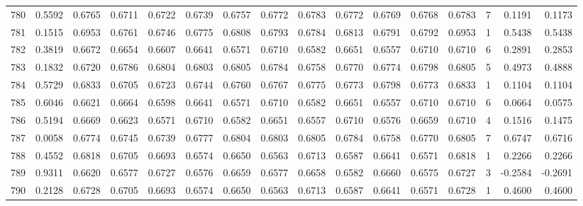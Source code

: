 \begin{tabular}{lrrrrrrrrrrrrrrr}
780 &      0.5592 &  0.6765 &  0.6711 &  0.6722 &  0.6739 &  0.6757 &  0.6772 &  0.6783 &  0.6772 &  0.6769 &   0.6768 &     0.6783 &      7 &                    0.1191 &                     0.1173 \\
781 &      0.1515 &  0.6953 &  0.6761 &  0.6746 &  0.6775 &  0.6808 &  0.6793 &  0.6784 &  0.6813 &  0.6791 &   0.6792 &     0.6953 &      1 &                    0.5438 &                     0.5438 \\
782 &      0.3819 &  0.6672 &  0.6654 &  0.6607 &  0.6641 &  0.6571 &  0.6710 &  0.6582 &  0.6651 &  0.6557 &   0.6710 &     0.6710 &      6 &                    0.2891 &                     0.2853 \\
783 &      0.1832 &  0.6720 &  0.6786 &  0.6804 &  0.6803 &  0.6805 &  0.6784 &  0.6758 &  0.6770 &  0.6774 &   0.6798 &     0.6805 &      5 &                    0.4973 &                     0.4888 \\
784 &      0.5729 &  0.6833 &  0.6705 &  0.6723 &  0.6744 &  0.6760 &  0.6767 &  0.6775 &  0.6773 &  0.6798 &   0.6773 &     0.6833 &      1 &                    0.1104 &                     0.1104 \\
785 &      0.6046 &  0.6621 &  0.6664 &  0.6598 &  0.6641 &  0.6571 &  0.6710 &  0.6582 &  0.6651 &  0.6557 &   0.6710 &     0.6710 &      6 &                    0.0664 &                     0.0575 \\
786 &      0.5194 &  0.6669 &  0.6623 &  0.6571 &  0.6710 &  0.6582 &  0.6651 &  0.6557 &  0.6710 &  0.6576 &   0.6659 &     0.6710 &      4 &                    0.1516 &                     0.1475 \\
787 &      0.0058 &  0.6774 &  0.6745 &  0.6739 &  0.6777 &  0.6804 &  0.6803 &  0.6805 &  0.6784 &  0.6758 &   0.6770 &     0.6805 &      7 &                    0.6747 &                     0.6716 \\
788 &      0.4552 &  0.6818 &  0.6705 &  0.6693 &  0.6574 &  0.6650 &  0.6563 &  0.6713 &  0.6587 &  0.6641 &   0.6571 &     0.6818 &      1 &                    0.2266 &                     0.2266 \\
789 &      0.9311 &  0.6620 &  0.6577 &  0.6727 &  0.6576 &  0.6659 &  0.6577 &  0.6658 &  0.6582 &  0.6660 &   0.6575 &     0.6727 &      3 &                   -0.2584 &                    -0.2691 \\
790 &      0.2128 &  0.6728 &  0.6705 &  0.6693 &  0.6574 &  0.6650 &  0.6563 &  0.6713 &  0.6587 &  0.6641 &   0.6571 &     0.6728 &      1 &                    0.4600 &                     0.4600 \\

\end{tabular}
